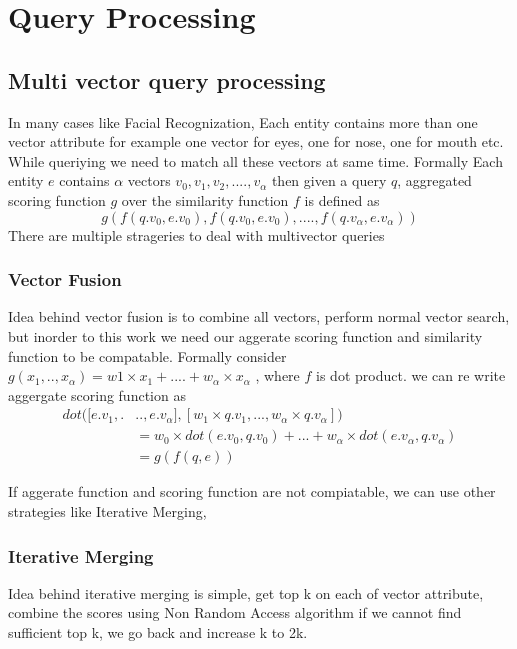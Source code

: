 \documentclass[conference]{IEEEtran}
\begin{document}
\section{Query Processing}
\subsection{Multi vector query processing}
In many cases like Facial Recognization, Each entity contains more than one vector attribute for example one vector for eyes, one for nose, one for mouth etc. While queriying we need to match all these vectors at same time. Formally Each entity $e$ contains $\alpha$ vectors $v_0, v_1, v_2, .... ,v_{\alpha}$ then given a query $q$, aggregated scoring function $g$ over the similarity function $f$ is defined as 
\begin{equation*}
g(f(q.v_0,e.v_0),f(q.v_0,e.v_0),....,f(q.v_{\alpha},e.v_{\alpha}))
\end{equation*}
There are multiple strageries to deal with multivector queries

\subsubsection{Vector Fusion}
Idea behind vector fusion is to combine all vectors, perform normal vector search, but inorder to this work we need our aggerate scoring function and similarity function to be compatable. Formally consider $g(x_1,..,x_{\alpha})=w1\times x_1 + .... + w_{\alpha} \times x_{\alpha}$ , where $f$ is dot product. we can re write aggergate scoring function as 
\begin{align*}
dot([e.v_1,.&..,e.v_{\alpha}],[w_1\times q.v_1,...,w_{\alpha}\times q.v_{\alpha}]) \\&= w_0\times dot(e.v_0,q.v_0)+...+w_{\alpha}\times dot(e.v_{\alpha},q.v_{\alpha}) \\
&= g(f(q,e)) 
\end{align*}

If aggerate function and scoring function are not compiatable, we can use other strategies like Iterative Merging,  
\subsubsection{Iterative Merging}

Idea behind iterative merging is simple, get top k on each of vector attribute, combine the scores using Non Random Access algorithm \cite{DBLP:journals/corr/cs-DB-0204046} if we cannot find sufficient top k, we go back and increase k to 2k. 
\end{document}

